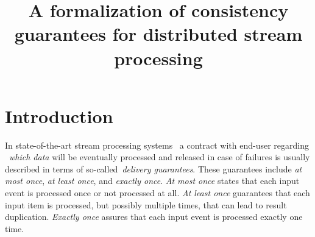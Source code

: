 \documentclass[sigconf]{acmart}
\theoremstyle{remark}
\begin{document}
\title {A formalization of consistency guarantees for distributed stream processing}



\maketitle

\section {Introduction}

In state-of-the-art stream processing systems~\cite{carbone2015apache, apache:storm, Zaharia:2016:ASU:3013530.2934664} a contract with end-user regarding ~{\em which data} will be eventually processed and released in case of failures is usually described in terms of so-called~{\em delivery guarantees}. These guarantees include {\em at most once}, {\em at least once}, and {\em exactly once}. {\it At most once} states that each input event is processed once or not processed at all. {\it At least once} guarantees that each input item is processed, but possibly multiple times, that can lead to result duplication. {\it Exactly once} assures that each input event is processed exactly one time.
\end{document}
